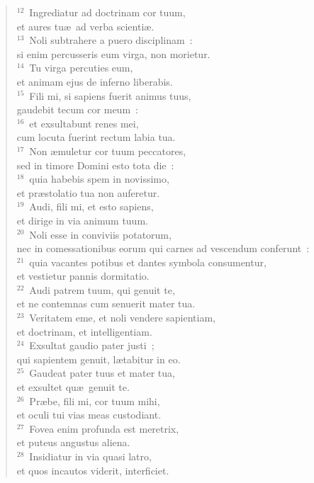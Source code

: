 \begin{flushleft}\begin{verse}${}^{12}$~Ingrediatur ad doctrinam cor tuum,\\ et aures tu\ae\ ad verba scienti\ae .\\
${}^{13}$~Noli subtrahere a puero disciplinam~:\\ si enim percusseris eum virga, non morietur.\\
${}^{14}$~Tu virga percuties eum,\\ et animam ejus de inferno liberabis.\\
${}^{15}$~Fili mi, si sapiens fuerit animus tuus,\\ gaudebit tecum cor meum~:\\
${}^{16}$~et exsultabunt renes mei,\\ cum locuta fuerint rectum labia tua.\\
${}^{17}$~Non \ae muletur cor tuum peccatores,\\ sed in timore Domini esto tota die~:\\
${}^{18}$~quia habebis spem in novissimo,\\ et pr\ae stolatio tua non auferetur.\\
${}^{19}$~Audi, fili mi, et esto sapiens,\\ et dirige in via animum tuum.\\
${}^{20}$~Noli esse in conviviis potatorum,\\ nec in comessationibus eorum qui carnes ad vescendum conferunt~:\\
${}^{21}$~quia vacantes potibus et dantes symbola consumentur,\\ et vestietur pannis dormitatio.\\
${}^{22}$~Audi patrem tuum, qui genuit te,\\ et ne contemnas cum senuerit mater tua.\\
${}^{23}$~Veritatem eme, et noli vendere sapientiam,\\ et doctrinam, et intelligentiam.\\
${}^{24}$~Exsultat gaudio pater justi~;\\ qui sapientem genuit, l\ae tabitur in eo.\\
${}^{25}$~Gaudeat pater tuus et mater tua,\\ et exsultet qu\ae\ genuit te.\\
${}^{26}$~Pr\ae be, fili mi, cor tuum mihi,\\ et oculi tui vias meas custodiant.\\
${}^{27}$~Fovea enim profunda est meretrix,\\ et puteus angustus aliena.\\
${}^{28}$~Insidiatur in via quasi latro,\\ et quos incautos viderit, interficiet.\end{verse}\end{flushleft}


